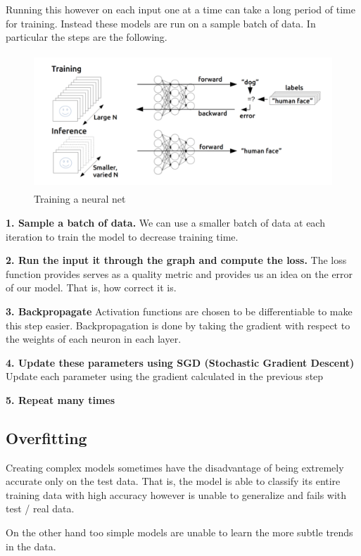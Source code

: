 \documentclass[twoside]{article}
\begin{document}
Running this however on each input one at a time can take a long period of time for training. Instead these models are run on a sample batch of data. In particular the steps are the following.\\

\begin{figure}[!htb]
\centering
\includegraphics[height = 2in]{pics/training_net.png}
\caption{Training a neural net\cite{}}
\label{fig:Training a neural net}
\end{figure}

\textbf{1. Sample a batch of data.}
We can use a smaller batch of data at each iteration to train the model to decrease training time.

\textbf{2. Run the input it through the graph and compute the loss.}
The loss function provides serves as a quality metric and provides us an idea on the error of our model. That is, how correct it is.

\textbf{3. Backpropagate}
Activation functions are chosen to be differentiable to make this step easier. Backpropagation is done by taking the gradient with respect to the weights of each neuron in each layer.

\textbf{4. Update these parameters using SGD (Stochastic Gradient Descent)}
Update each parameter using the gradient calculated in the previous step

\textbf{5. Repeat many times}

\subsection{Overfitting}
Creating complex models sometimes have the disadvantage of being extremely accurate only on the test data. That is, the model is able to classify its entire training data with high accuracy however is unable to generalize and fails with test / real data.

On the other hand too simple models are unable to learn the more subtle trends in the data.
\end{document}
